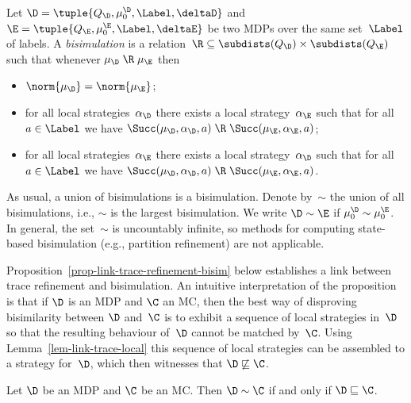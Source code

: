 \noindent
Let   $\D = \tuple{Q_\D,\mu^{\D}_{0},\Label,\deltaD}$ and $\E = \tuple{Q_\E,\mu^{\E}_{0},\Label,\deltaE}$ be two MDPs over
the same set~$\Label$ of labels.
A \emph{bisimulation} is a relation~$\R \subseteq \subdists(Q_\D) \times \subdists(Q_\E)$ such that whenever
 $\mu_\D \mathrel{\R} \mu_\E$ then
\begin{itemize}
\item $\norm{\mu_\D} = \norm{\mu_\E}$;
\item for all local strategies~$\alpha_\D$ there exists a local strategy~$\alpha_\E$ such that for all $a \in \Label$ we have $\Succ(\mu_\D, \alpha_\D, a) \mathrel{\R} \Succ(\mu_\E, \alpha_\E, a)$;
\item for all local strategies~$\alpha_\E$ there exists a local strategy~$\alpha_\D$ such that for all $a \in \Label$ we have $\Succ(\mu_\D, \alpha_\D, a) \mathrel{\R} \Succ(\mu_\E, \alpha_\E, a)$.
\end{itemize}
As usual, a union of bisimulations is a bisimulation.
Denote by~$\mathord{\sim}$ the union of all bisimulations, i.e., $\mathord{\sim}$ is the largest bisimulation.
We write $\D \sim \E$ if $\mu^\D_{0} \sim \mu^{\E}_{0}$.
In general, the set~$\sim$ is uncountably infinite, so methods for computing state-based bisimulation (e.g., partition refinement) are not applicable.

Proposition~\ref{prop-link-trace-refinement-bisim} below establishes a link between trace refinement and bisimulation.
An intuitive interpretation of the proposition is that if $\D$ is an MDP and $\C$ an MC, then the best way of disproving bisimilarity between $\D$ and~$\C$ is to exhibit a sequence of local strategies in~$\D$ so that the resulting behaviour of~$\D$ cannot be matched by~$\C$.
Using Lemma~\ref{lem-link-trace-local} this sequence of local strategies can be assembled to a strategy for~$\D$, which then witnesses that $\D \not\sqsubseteq \C$.

\begin{prop}\label{prop-link-trace-refinement-bisim}
Let $\D$ be an MDP and $\C$ be an MC\@.
Then $\D \sim \C$ if and only if $\D \sqsubseteq \C$.
\end{prop}

